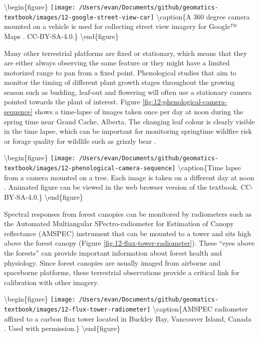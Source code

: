 \documentclass[
]{book}
\begin{document}
\textbackslash begin\{figure\}
\texttt{[image: /Users/evan/Documents/github/geomatics-textbook/images/12-google-street-view-car]} \textbackslash caption\{A 360 degree camera mounted on a vehicle is used for collecting street view imagery for Google™ Maps \citep{leggett_google_2014}. CC-BY-SA-4.0.\}\label{fig:12-google-street-view-car}
\textbackslash end\{figure\}

Many other terrestrial platforms are fixed or stationary, which means that they are either always observing the same feature or they might have a limited motorized range to pan from a fixed point. Phenological studies that aim to monitor the timing of different plant growth stages throughout the growing season such as budding, leaf-out and flowering will often use a stationary camera pointed towards the plant of interest. Figure \ref{fig:12-phenological-camera-sequence} shows a time-lapse of images taken once per day at noon during the spring time near Grand Cache, Alberta. The changing leaf colour is clearly visible in the time lapse, which can be important for monitoring springtime wildfire risk \citep{pickell_early_2017} or forage quality for wildlife such as grizzly bear \citep{bater_using_2010}.

\textbackslash begin\{figure\}
\texttt{[image: /Users/evan/Documents/github/geomatics-textbook/images/12-phenological-camera-sequence]} \textbackslash caption\{Time lapse from a camera mounted on a tree. Each image is taken on a different day at noon \citep{bater_timelapse_nodate}. Animated figure can be viewed in the web browser version of the textbook. CC-BY-SA-4.0.\}\label{fig:12-phenological-camera-sequence}
\textbackslash end\{figure\}

Spectral responses from forest canopies can be monitored by radiometers such as the Automated Multiangular SPectro-radiometer for Estimation of Canopy reflectance (AMSPEC) instrument that can be mounted to a tower and sits high above the forest canopy (Figure \ref{fig:12-flux-tower-radiometer}). These ``eyes above the forests'' can provide important information about forest health and physiology. Since forest canopies are usually imaged from airborne and spaceborne platforms, these terrestrial observations provide a critical link for calibration with other imagery.

\textbackslash begin\{figure\}
\texttt{[image: /Users/evan/Documents/github/geomatics-textbook/images/12-flux-tower-radiometer]} \textbackslash caption\{AMSPEC radiometer affixed to a carbon flux tower located in Buckley Bay, Vancouver Island, Canada \citep{coops_amspec_nodate}. Used with permission.\}\label{fig:12-flux-tower-radiometer}
\textbackslash end\{figure\}
\end{document}

